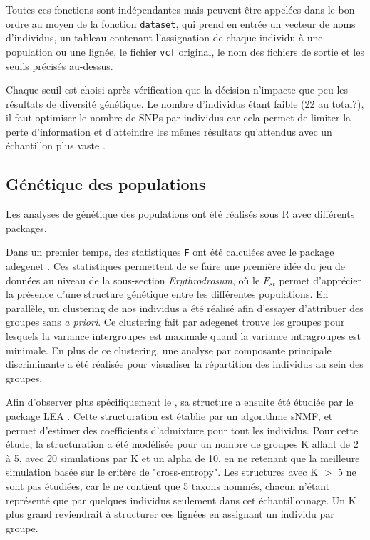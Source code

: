 Toutes ces fonctions sont indépendantes mais peuvent être appelées dans le bon ordre au moyen de la fonction \verb|dataset|, qui prend en entrée un vecteur de noms d'individus, un tableau contenant l'assignation de chaque individu à une population ou une lignée, le fichier \verb|vcf| original, le nom des fichiers de sortie et les seuils précisés au-dessus.

Chaque seuil est choisi après vérification que la décision n'impacte que peu les résultats de diversité génétique.
 Le nombre d'individus étant faible (22 au total?), il faut optimiser le nombre de SNPs par individus car cela permet de limiter la perte d'information et d'atteindre les mêmes résultats qu'attendus avec un échantillon plus vaste \citep{Nazareno2017}.


\subsection{Génétique des populations}

Les analyses de génétique des populations ont été réalisés sous R avec différents packages. 

Dans un premier temps, des statistiques \verb|F| ont été calculées avec le package adegenet \citep{Jombart2011}. Ces statistiques permettent de se faire une première idée du jeu de données au niveau de la sous-section \textit{Erythrodrosum}, où le $F_{st}$ permet d'apprécier la présence d'une structure génétique entre les différentes populations.
 En parallèle, un clustering de nos individus a été réalisé afin d'essayer d'attribuer des groupes sans \textit{a priori}. Ce clustering fait par adegenet trouve les groupes pour lesquels la variance intergroupes est maximale quand la variance intragroupes est minimale. En plus de ce clustering, une analyse par composante principale discriminante a été réalisée pour visualiser la répartition des individus au sein des groupes.
 
Afin d'observer plus spécifiquement le , sa structure a ensuite été étudiée par le package LEA \citep{Frichot2015}. Cette structuration est établie par un algorithme sNMF, et permet d'estimer des coefficients d'admixture pour tout les individus. Pour cette étude, la structuration a été modélisée pour un nombre de groupes K allant de 2 à 5, avec 20 simulations par K et un alpha de 10, en ne retenant que la meilleure simulation basée sur le critère de "cross-entropy". Les structures avec K $>$ 5 ne sont pas étudiées, car le  ne contient que 5 taxons nommés, chacun n'étant représenté que par quelques individus seulement dans cet échantillonnage. Un K plus grand reviendrait à structurer ces lignées en assignant un individu par groupe.
 
